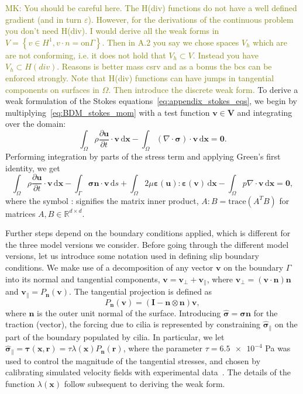 \documentclass[fleqn]{wlscirep}
\newcommand{\pdifft}[1]{\frac{\partial  #1}{\partial t}}
\newcommand{\intO}[1]{\int_{\Omega}#1 \, \mathrm d\bm{x}}
\newcommand{\intG}[1]{\int_{\Gamma}#1 \, \mathrm ds}
\newcommand{\nn}{\mathbf{n}}
\newcommand{\rr}{\mathbf{r}}
\newcommand{\uu}{\mathbf{u}}
\newcommand{\vv}{\mathbf{v}}
\newcommand{\xx}{\bm{x}}
\newcommand{\VV}{\mathbf{V}}
\newcommand{\bsig}{\bm{\sigma}}
\newcommand{\bsigpar}{\hat{\bsig}_{\parallel}}
\newcommand{\beps}{\bm{\varepsilon}}
\newcommand{\btau}{\bm{\tau}}
\newcommand{\mk}[1]{\textcolor{olive}{MK: #1}}
\begin{document}
\mk{
You should be careful here. The H(div) functions do not have a
well defined gradient (and in turn $\varepsilon$). However, for the derivations of
the continuous problem you don't need H(div). I would derive all the weak forms
in $V = \left\{ v\in H^1, v\cdot n = \text{on} \Gamma\right\}$. Then in A.2 you say we
chose spaces $V_h$ which are are not conforming, i.e. it does not hold that $V_h\subset V$.
Instead you have $V_h\subset H(div)$. Reasons is better mass csrv and as a
bonus the bcs can be enforced strongly. Note that H(div) functions can have
jumps in tangential components on surfaces in $\Omega$. Then introduce the discrete weak form.  
}
To derive a weak formulation of the Stokes equations~\eqref{eq:appendix_stokes_eqs},
we begin by multiplying~\eqref{eq:BDM_stokes_mom} with a
test function $\vv\in\VV$ and integrating over the domain:
\begin{equation*}
    \intO{\rho\pdifft{\uu}\cdot\vv} - \intO{(\nabla\cdot\bsig)\cdot\vv} = \mathbf{0}.
\end{equation*}
Performing integration by parts of the stress term and applying Green's first identity, we get
\begin{equation}
    \intO{\rho\pdifft{\uu}\cdot\vv}
    - \intG{\bsig\nn\cdot\vv}
    + \intO{2\mu\beps(\uu) : \beps(\vv)}
    - \intO{p\nabla\cdot\vv} = \mathbf{0}, \label{eq:modelA_weak_form1}
\end{equation}
where the symbol : signifies the matrix inner product,
$A:B=\text{trace}{(A^TB)}$ for matrices $A, B\in\mathbb{R}^{d\times d}$. 

Further steps depend on the boundary conditions applied,
which is different for the three model versions we consider.
Before going through the different model versions, let us introduce
some notation used in defining slip boundary conditions. We make use of a decomposition
of any vector $\vv$ on the boundary $\Gamma$ into its normal and tangential components,
$\vv = \vv_{\perp} + \vv_{\parallel}$, where $\vv_{\perp}=(\vv\cdot\nn)\nn$ and
$\vv_{\parallel}=P_{\nn}(\vv)$. The tangential projection is defined as
\begin{equation}
    P_{\nn}(\vv) = (\mathbf{I} - \nn\otimes\nn)\vv,
    \label{eq:projection_operator_appendix}
\end{equation}
where $\nn$ is the outer unit normal of the surface. Introducing
$\hat{\bsig} = \bsig\nn$ for the traction (vector), the forcing due
to cilia is represented by constraining $\bsigpar$ on the part of the
boundary populated by cilia. In particular, we let
$\bsigpar = \btau(\xx, \rr) = \tau\lambda(\xx) P_{\nn}(\rr)$,
where the parameter $\tau=\num{6.5e-4}$ Pa was used to control the magnitude
of the tangential stresses, and chosen by calibrating simulated velocity
fields with experimental data~\cite{Olstad2019CiliaryDevelopment}.
The details of the function $\lambda(\xx)$ follow subsequent to deriving the weak form.
\end{document}
